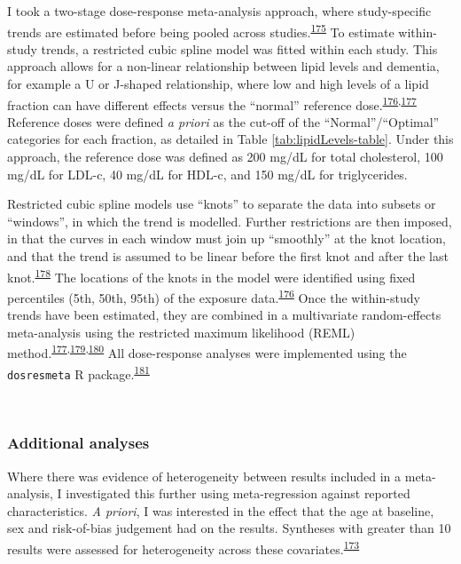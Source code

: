 \documentclass[a4paper, twoside]{templates/ociamthesis}
\begin{document}
I took a two-stage dose-response meta-analysis approach, where study-specific trends are estimated before being pooled across studies.\textsuperscript{\protect\hyperlink{ref-greenland1992}{175}} To estimate within-study trends, a restricted cubic spline model was fitted within each study. This approach allows for a non-linear relationship between lipid levels and dementia, for example a U or J-shaped relationship, where low and high levels of a lipid fraction can have different effects versus the ``normal'' reference dose.\textsuperscript{\protect\hyperlink{ref-durrleman1989}{176},\protect\hyperlink{ref-liu2009}{177}} Reference doses were defined \emph{a priori} as the cut-off of the ``Normal''/``Optimal'' categories for each fraction, as detailed in Table \ref{tab:lipidLevels-table}. Under this approach, the reference dose was defined as 200 mg/dL for total cholesterol, 100 mg/dL for LDL-c, 40 mg/dL for HDL-c, and 150 mg/dL for triglycerides.

Restricted cubic spline models use ``knots'' to separate the data into subsets or ``windows'', in which the trend is modelled. Further restrictions are then imposed, in that the curves in each window must join up ``smoothly'' at the knot location, and that the trend is assumed to be linear before the first knot and after the last knot.\textsuperscript{\protect\hyperlink{ref-gauthier2020}{178}} The locations of the knots in the model were identified using fixed percentiles (5th, 50th, 95th) of the exposure data.\textsuperscript{\protect\hyperlink{ref-durrleman1989}{176}} Once the within-study trends have been estimated, they are combined in a multivariate random-effects meta-analysis using the restricted maximum likelihood (REML) method.\textsuperscript{\protect\hyperlink{ref-liu2009}{177},\protect\hyperlink{ref-white2009}{179},\protect\hyperlink{ref-gasparrini2012}{180}} All dose-response analyses were implemented using the \texttt{dosresmeta} R package.\textsuperscript{\protect\hyperlink{ref-crippa2016}{181}}

~

\hypertarget{additional-analyses}{%
\subsubsection{Additional analyses}\label{additional-analyses}}

Where there was evidence of heterogeneity between results included in a meta-analysis, I investigated this further using meta-regression against reported characteristics. \emph{A priori}, I was interested in the effect that the age at baseline, sex and risk-of-bias judgement had on the results. Syntheses with greater than 10 results were assessed for heterogeneity across these covariates.\textsuperscript{\protect\hyperlink{ref-deeks2019}{173}}
\end{document}
